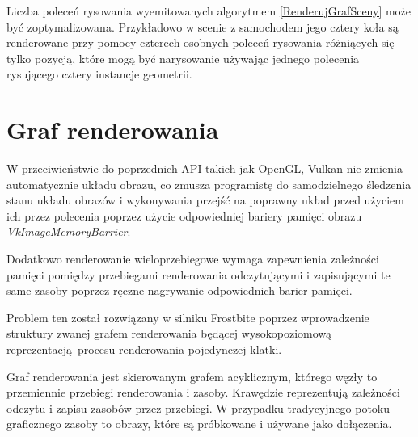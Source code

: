 Liczba poleceń rysowania wyemitowanych algorytmem \ref{RenderujGrafSceny} może być zoptymalizowana.
Przykładowo w scenie z samochodem jego cztery koła są renderowane przy pomocy czterech osobnych poleceń rysowania różniących się tylko pozycją, które mogą być narysowanie używając jednego polecenia rysującego cztery instancje geometrii.

\section{Graf renderowania}

W przeciwieństwie do poprzednich API takich jak OpenGL, Vulkan nie zmienia automatycznie układu obrazu, co zmusza
programistę do samodzielnego śledzenia stanu układu obrazów i wykonywania przejść na poprawny układ przed użyciem ich przez polecenia poprzez użycie odpowiedniej bariery pamięci obrazu \textit{VkImageMemoryBarrier}.

Dodatkowo renderowanie wieloprzebiegowe wymaga zapewnienia zależności pamięci pomiędzy przebiegami renderowania odczytującymi i zapisującymi te same zasoby poprzez ręczne nagrywanie odpowiednich barier pamięci.

Problem ten został rozwiązany w silniku Frostbite poprzez wprowadzenie struktury zwanej grafem renderowania \cite{FRAMEGRAPH} będącej wysokopoziomową reprezentacją procesu renderowania pojedynczej klatki.

Graf renderowania jest skierowanym grafem acyklicznym, którego węzły to przemiennie przebiegi renderowania i zasoby.
Krawędzie reprezentują zależności odczytu i zapisu zasobów przez przebiegi. W przypadku tradycyjnego potoku graficznego zasoby to obrazy, które są próbkowane i używane jako dołączenia.


